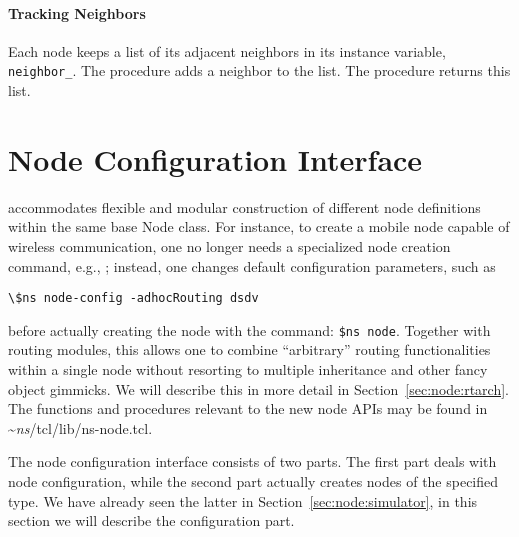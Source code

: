 \paragraph{Tracking Neighbors}
Each node keeps a list of its adjacent neighbors in its instance variable,
{\tt neighbor\_}.  The procedure  adds a neighbor to the list.  The procedure  returns this list.

\section{Node Configuration Interface}
\label{sec:node:nodeconfig}


 accommodates flexible and modular
construction of different node definitions within the same base Node
class.
For instance, to create a mobile node capable
of wireless communication, one no longer needs a specialized node
creation command, e.g., ; instead, one
changes default configuration parameters, such as  
\begin{verbatim}
\$ns node-config -adhocRouting dsdv 
\end{verbatim}
before actually 
creating the node with the command: {\tt \$ns node}.
Together with routing modules, this allows
one to combine ``arbitrary'' routing functionalities within a single
node without resorting to multiple inheritance and other fancy object
gimmicks. 
We will describe this in more detail in Section~\ref{sec:node:rtarch}.
The functions and procedures relevant to the new node APIs may be
found in \textasciitilde\emph{ns}/{tcl/lib/ns-node.tcl}.

The node configuration interface consists of two parts. 
The first part deals with node configuration, while the second part
actually creates nodes of the specified type. 
We have already seen the latter in Section~\ref{sec:node:simulator},
in this section we will describe the configuration part. 

